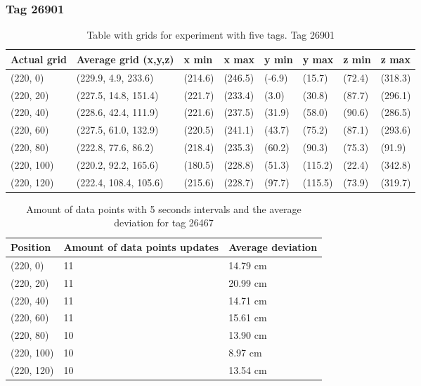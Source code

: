 \subsubsection{Tag 26901}
\begin{table}[H] 
    \centering
    \begin{tabular}{|l|l|l|l|l|l|l|l|}
    \hline
    Actual grid & Average grid (x,y,z)   & x min    & x max     & y min      & y max     & z min   & z max    \\ \hline
(220, 0) 	& (229.9, 4.9, 233.6)   	 & (214.6) 	& (246.5)	& (-6.9)	 & (15.7) 	 & (72.4)	 & (318.3)	\\ \hline
(220, 20) 	& (227.5, 14.8, 151.4)   	 & (221.7) 	& (233.4)	& (3.0)	     & (30.8) 	 & (87.7)	 & (296.1)	\\ \hline
(220, 40) 	& (228.6, 42.4, 111.9) 	     & (221.6) 	& (237.5)	& (31.9)	 & (58.0) 	 & (90.6)	 & (286.5)	\\ \hline
(220, 60) 	& (227.5, 61.0, 132.9) 	     & (220.5) 	& (241.1)	& (43.7)	 & (75.2) 	 & (87.1)	 & (293.6)	\\ \hline
(220, 80) 	& (222.8, 77.6, 86.2)    	 & (218.4) 	& (235.3)	& (60.2)	 & (90.3) 	 & (75.3)	 & (91.9)	\\ \hline
(220, 100) 	& (220.2, 92.2, 165.6) 	     & (180.5) 	& (228.8)	& (51.3)	 & (115.2) 	 & (22.4)	 & (342.8)	\\ \hline
(220, 120) 	& (222.4, 108.4, 105.6) 	 & (215.6) 	& (228.7)	& (97.7)	 & (115.5) 	 & (73.9)	 & (319.7)	\\ \hline
\end{tabular}
\caption{Table with grids for experiment with five tags. Tag 26901}
\end{table}

\begin{table}[H]
    \centering
    \begin{tabular}{|l|l|l|}
    \hline
    Position   & Amount of data points updates & Average deviation \\ \hline
    (220, 0)   & 11                 &  14.79 cm                 \\ \hline
    (220, 20)  & 11                &  20.99 cm                 \\ \hline
    (220, 40)  & 11                &  14.71 cm                 \\ \hline
    (220, 60)  & 11                &  15.61 cm                 \\ \hline
    (220, 80)  & 10                &  13.90 cm                 \\ \hline
    (220, 100) & 10                &  8.97 cm                 \\ \hline
    (220, 120) & 10                &  13.54 cm                 \\ \hline
    \end{tabular}
    \caption{Amount of data points with 5 seconds intervals and the average deviation for tag 26467}
\end{table}


